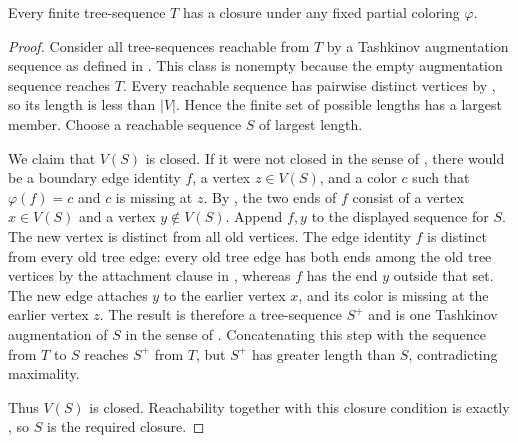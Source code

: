 \begin{lemma}
Every finite tree-sequence $T$ has a closure under any fixed partial
coloring $\varphi$.
\end{lemma}
\begin{proof}
Consider all tree-sequences reachable from $T$ by a Tashkinov augmentation
sequence as defined in .  This class
is nonempty because the empty augmentation sequence reaches $T$.  Every
reachable sequence has pairwise distinct vertices by ,
so its length is less than $|V|$.  Hence the finite set of possible lengths
has a largest member.  Choose a reachable sequence $S$ of largest length.

We claim that $V(S)$ is closed.  If it were not closed in the sense of
, there would be a boundary edge identity
$f$, a vertex $z\in V(S)$, and a color $c$ such that
$\varphi(f)=c$ and $c$ is missing at $z$.  By
, the two ends of $f$ consist of a vertex
$x\in V(S)$ and a vertex $y\notin V(S)$.  Append $f,y$ to the displayed
sequence for $S$.  The new vertex is distinct from all old vertices.  The
edge identity $f$ is distinct from every old tree edge: every old tree edge
has both ends among the old tree vertices by the attachment clause in
, whereas $f$ has the end $y$ outside that set.  The
new edge attaches $y$ to the earlier vertex $x$, and its color is missing at
the earlier vertex $z$.  The result is therefore a tree-sequence $S^+$ and
is one Tashkinov augmentation of $S$ in the sense of
.  Concatenating this step with the sequence
from $T$ to $S$ reaches $S^+$ from $T$, but $S^+$ has greater length than
$S$, contradicting maximality.

Thus $V(S)$ is closed.  Reachability together with this closure condition is
exactly , so $S$ is the required closure.
\end{proof}
